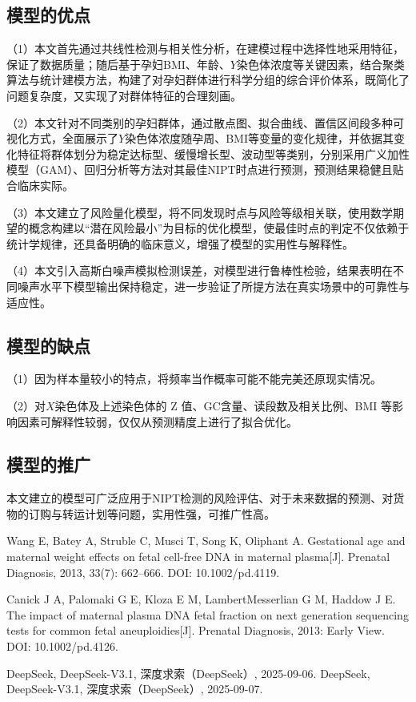 \documentclass[12pt]{ctexart}
\begin{document}
	\subsection{模型的优点}
	
（1）本文首先通过共线性检测与相关性分析，在建模过程中选择性地采用特征，保证了数据质量；随后基于孕妇BMI、年龄、$Y$染色体浓度等关键因素，结合聚类算法与统计建模方法，构建了对孕妇群体进行科学分组的综合评价体系，既简化了问题复杂度，又实现了对群体特征的合理刻画。

（2）本文针对不同类别的孕妇群体，通过散点图、拟合曲线、置信区间段多种可视化方式，全面展示了$Y$染色体浓度随孕周、BMI等变量的变化规律，并依据其变化特征将群体划分为稳定达标型、缓慢增长型、波动型等类别，分别采用广义加性模型（GAM）、回归分析等方法对其最佳NIPT时点进行预测，预测结果稳健且贴合临床实际。

（3）本文建立了风险量化模型，将不同发现时点与风险等级相关联，使用数学期望的概念构建以“潜在风险最小”为目标的优化模型，使最佳时点的判定不仅依赖于统计学规律，还具备明确的临床意义，增强了模型的实用性与解释性。

（4）本文引入高斯白噪声模拟检测误差，对模型进行鲁棒性检验，结果表明在不同噪声水平下模型输出保持稳定，进一步验证了所提方法在真实场景中的可靠性与适应性。
	
	\subsection{模型的缺点}
	（1）因为样本量较小的特点，将频率当作概率可能不能完美还原现实情况。
	
	（2）对$X$染色体及上述染色体的 Z 值、GC含量、读段数及相关比例、BMI 等影响因素可解释性较弱，仅仅从预测精度上进行了拟合优化。
	\subsection{模型的推广}
	本文建立的模型可广泛应用于NIPT检测的风险评估、对于未来数据的预测、对货物的订购与转运计划等问题，实用性强，可推广性高。
	
	\newpage
	\begin{thebibliography}{9}
		 Wang E, Batey A, Struble C, Musci T, Song K, Oliphant A. Gestational age and maternal weight effects on fetal cell-free DNA in maternal plasma[J]. Prenatal Diagnosis, 2013, 33(7): 662–666. DOI: 10.1002/pd.4119.
		
		 Canick J A, Palomaki G E, Kloza E M, Lambert\textendash Messerlian G M, Haddow J E. The impact of maternal plasma DNA fetal fraction on next generation sequencing tests for common fetal aneuploidies[J]. Prenatal Diagnosis, 2013: Early View. DOI: 10.1002/pd.4126.
		
		DeepSeek, DeepSeek-V3.1, 深度求索（DeepSeek）, 2025-09-06.
		DeepSeek, DeepSeek-V3.1, 深度求索（DeepSeek）, 2025-09-07.
		
	\end{thebibliography}
	
\end{document}
